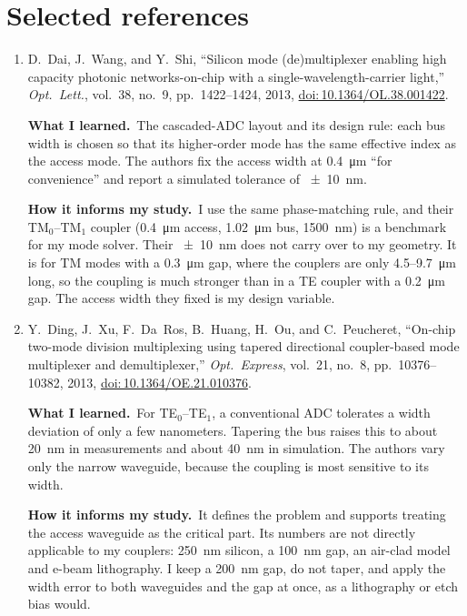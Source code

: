 \documentclass[12pt,a4paper]{article}
\newcommand{\TE}[1]{TE$_{#1}$}
\newcommand{\TM}[1]{TM$_{#1}$}
\newcommand{\doi}[1]{\href{https://doi.org/#1}{doi:\,#1}}
\newcommand{\learned}{\textbf{What I learned.}\ }
\newcommand{\informs}{\textbf{How it informs my study.}\ }
\begin{document}
\section*{Selected references}

\begin{enumerate}
\renewcommand{\labelenumi}{[\arabic{enumi}]}

\item \label{ref:dai}
  D.~Dai, J.~Wang, and Y.~Shi, ``Silicon mode (de)multiplexer enabling high capacity
  photonic networks-on-chip with a single-wavelength-carrier light,''
  \emph{Opt.\ Lett.}, vol.~38, no.~9, pp.~1422--1424, 2013, \doi{10.1364/OL.38.001422}.

  \learned The cascaded-ADC layout and its design rule: each bus width is chosen so
  that its higher-order mode has the same effective index as the access mode. The
  authors fix the access width at \qty{0.4}{\um} ``for convenience'' and report a
  simulated tolerance of \qty{\pm 10}{\nm}.

  \informs I use the same phase-matching rule, and their \TM{0}--\TM{1} coupler
  (\qty{0.4}{\um} access, \qty{1.02}{\um} bus, \qty{1500}{\nm}) is a benchmark for
  my mode solver. Their \qty{\pm 10}{\nm} does not carry over to my geometry. It is
  for TM modes with a \qty{0.3}{\um} gap, where the couplers are only
  4.5--\qty{9.7}{\um} long, so the coupling is much stronger than in a TE coupler
  with a \qty{0.2}{\um} gap. The access width they fixed is my design variable.

\item \label{ref:ding}
  Y.~Ding, J.~Xu, F.~Da~Ros, B.~Huang, H.~Ou, and C.~Peucheret, ``On-chip two-mode
  division multiplexing using tapered directional coupler-based mode multiplexer
  and demultiplexer,'' \emph{Opt.\ Express}, vol.~21, no.~8, pp.~10376--10382, 2013,
  \doi{10.1364/OE.21.010376}.

  \learned For \TE{0}--\TE{1}, a conventional ADC tolerates a width deviation of
  only a few nanometers. Tapering the bus raises this to about \qty{20}{\nm} in
  measurements and about \qty{40}{\nm} in simulation. The authors vary only the
  narrow waveguide, because the coupling is most sensitive to its width.

  \informs It defines the problem and supports treating the access waveguide as the
  critical part. Its numbers are not directly applicable to my couplers:
  \qty{250}{\nm} silicon, a \qty{100}{\nm} gap, an air-clad model and e-beam
  lithography. I keep a \qty{200}{\nm} gap, do not taper, and apply the width error
  to both waveguides and the gap at once, as a lithography or etch bias would.


\end{enumerate}
\end{document}
